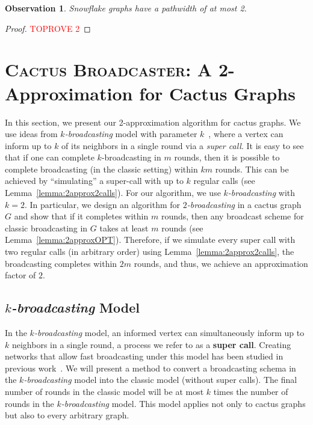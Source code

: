 \documentclass[letterpaper,11pt]{article}
\newtheorem{observation}{Observation}[section]
\newcommand{\Flower}{Snowflake\xspace}
\newcommand{\fast}{\textit{$k$-broadcasting}\xspace}
\newcommand{\Fast}{\textit{$k$-broadcasting}\xspace}
\newcommand{\twofast}{\textit{$2$-broadcasting}\xspace}
\newcommand{\ouralgo}{\textsc{Cactus Broadcaster}\xspace}
\begin{document}
\begin{observation}
\label{obs:flower-pathwidth}
    \Flower graphs have a pathwidth of at most 2. 
\end{observation}

\begin{proof}\textcolor{red}{TOPROVE 2}\end{proof}

 \section{\ouralgo: A 2-Approximation for Cactus Graphs}
\label{sec:2approx}

In this section, we present our 2-approximation algorithm for cactus graphs. We use ideas from \fast model with parameter $k$~\cite{grigni1991tightkbroad}, where a vertex can inform up to $k$ of its neighbors in a single round via a 
\emph{super call}. It is easy to see that if one can complete $k$-broadcasting in $m$ rounds, then it is possible to complete broadcasting (in the classic setting) within $km$ rounds. This can be achieved by ``simulating'' a super-call with up to $k$ regular calls (see  Lemma~\ref{lemma:2approx2calls}).
For our algorithm, we use \fast with $k=2$. In particular, we design an algorithm for \twofast in a cactus graph $G$ and show that if it completes within $m$ rounds, then any broadcast scheme for classic broadcasting in $G$ takes at least $m$ rounds (see Lemma~\ref{lemma:2approxOPT}). Therefore, if we simulate every super call with two regular calls (in arbitrary order) using Lemma~\ref{lemma:2approx2calls}, the broadcasting completes within $2m$ rounds, and thus, we achieve an approximation factor of $2$. 


\subsection{\Fast Model}

In the \fast model, an informed vertex can simultaneously inform up to $k$ neighbors in a single round, a process we refer to as a \textbf{super call}.  
Creating networks that allow fast broadcasting under this model has been studied in previous work~\cite{harutyunyan2001improved}. 
We will present a method to convert a broadcasting schema in the \fast model into the classic model (without super calls). The final number of rounds in the classic model will be at most $k$ times the number of rounds in the \fast model. This model applies not only to cactus graphs but also to every arbitrary graph. 
\end{document}
